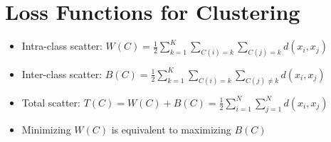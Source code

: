 \section{Loss Functions for Clustering}
\begin{itemize}
\item Intra-class scatter: $W(C) = \frac{1}{2} \sum\limits_{k=1}^K \sum\limits_{C(i)=k} \sum\limits_{C(j)=k} d(x_i, x_j)$
\item Inter-class scatter: $B(C) = \frac{1}{2} \sum\limits_{k=1}^K \sum\limits_{C(i)=k} \sum\limits_{C(j)\neq k} d(x_i, x_j)$
\item Total scatter: $T(C) = W(C) + B(C) = \frac{1}{2} \sum\limits_{i=1}^N \sum\limits_{j=1}^N d(x_i, x_j)$
\item Minimizing $W(C)$ is equivalent to maximizing $B(C)$
\end{itemize}